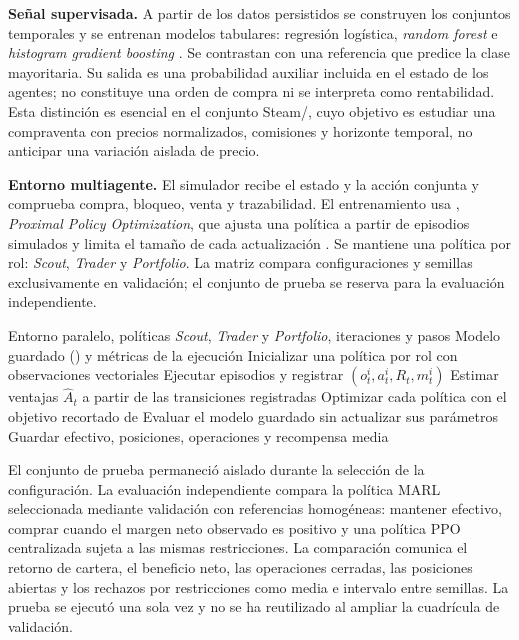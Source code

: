 \textbf{Señal supervisada.} A partir de los datos persistidos se construyen los conjuntos temporales y se entrenan modelos tabulares: regresión logística, \emph{random forest} e \emph{histogram gradient boosting} \cite{breiman2001random,friedman2001greedy}. Se contrastan con una referencia que predice la clase mayoritaria. Su salida es una probabilidad auxiliar incluida en el estado de los agentes; no constituye una orden de compra ni se interpreta como rentabilidad. Esta distinción es esencial en el conjunto Steam/, cuyo objetivo es estudiar una compraventa con precios normalizados, comisiones y horizonte temporal, no anticipar una variación aislada de precio.

\textbf{Entorno multiagente.} El simulador recibe el estado y la acción conjunta y comprueba compra, bloqueo, venta y trazabilidad. El entrenamiento usa , \emph{Proximal Policy Optimization}, que ajusta una política a partir de episodios simulados y limita el tamaño de cada actualización \cite{schulman2017ppo}. Se mantiene una política por rol: \textit{Scout}, \textit{Trader} y \textit{Portfolio}. La matriz compara configuraciones y semillas exclusivamente en validación; el conjunto de prueba se reserva para la evaluación independiente.

\begin{algorithm}[H]
\caption{Entrenamiento con PPO}
\label{alg:entrenamiento-ppo}
\begin{algorithmic}[1]
\Require Entorno paralelo, políticas \textit{Scout}, \textit{Trader} y \textit{Portfolio}, iteraciones y pasos
\Ensure Modelo guardado () y métricas de la ejecución
\State Inicializar una política  por rol con observaciones vectoriales
  \State Ejecutar episodios y registrar $(o_t^i,a_t^i,R_t,m_t^i)$
  \State Estimar ventajas $\widehat{A}_t$ a partir de las transiciones registradas
  \State Optimizar cada política con el objetivo recortado de 
\EndFor
\State Evaluar el modelo guardado sin actualizar sus parámetros
\State Guardar efectivo, posiciones, operaciones y recompensa media
\end{algorithmic}
\end{algorithm}

El conjunto de prueba permaneció aislado durante la selección de la configuración. La evaluación independiente compara la política MARL seleccionada mediante validación con referencias homogéneas: mantener efectivo, comprar cuando el margen neto observado es positivo y una política PPO centralizada sujeta a las mismas restricciones. La comparación comunica el retorno de cartera, el beneficio neto, las operaciones cerradas, las posiciones abiertas y los rechazos por restricciones como media e intervalo entre semillas. La prueba se ejecutó una sola vez y no se ha reutilizado al ampliar la cuadrícula de validación.

